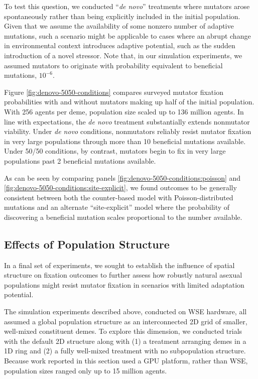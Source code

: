 To test this question, we conducted ``\textit{de novo}'' treatments where mutators arose spontaneously rather than being explicitly included in the initial population.
Given that we assume the availability of some nonzero number of adaptive mutations, such a scenario might be applicable to cases where an abrupt change in environmental context introduces adaptive potential, such as the sudden introduction of a novel stressor.
Note that, in our simulation experiments, we assumed mutators to originate with probability equivalent to beneficial mutations, $10^{-6}$.

Figure \ref{fig:denovo-5050-conditions} compares surveyed mutator fixation probabilities with and without mutators making up half of the initial population.
With 256 agents per deme, population size scaled up to 136 million agents.
In line with expectations, the \textit{de novo} treatment substantially extends nonmutator viability.
Under \textit{de novo} conditions, nonmutators reliably resist mutator fixation in very large populations through more than 10 beneficial mutations available.
Under 50/50 conditions, by contrast, mutators begin to fix in very large populations past 2 beneficial mutations available.

As can be seen by comparing panels \ref{fig:denovo-5050-conditions:poisson} and \ref{fig:denovo-5050-conditions:site-explicit}, we found outcomes to be generally consistent between both the counter-based model with Poisson-distributed mutations and an alternate ``site-explicit'' model where the probability of discovering a beneficial mutation scales proportional to the number available.

\subsection{Effects of Population Structure}
\label{sec:population-structure}

In a final set of experiments, we sought to establish the influence of spatial structure on fixation outcomes to further assess how robustly natural asexual populations might resist mutator fixation in scenarios with limited adaptation potential.

The simulation experiments described above, conducted on WSE hardware, all assumed a global population structure as an interconnected 2D grid of smaller, well-mixed constituent demes.
To explore this dimension, we conducted trials with the default 2D structure along with (1) a treatment arranging demes in a 1D ring and (2) a fully well-mixed treatment with no subpopulation structure.
Because work reported in this section used a GPU platform, rather than WSE, population sizes ranged only up to 15 million agents.

